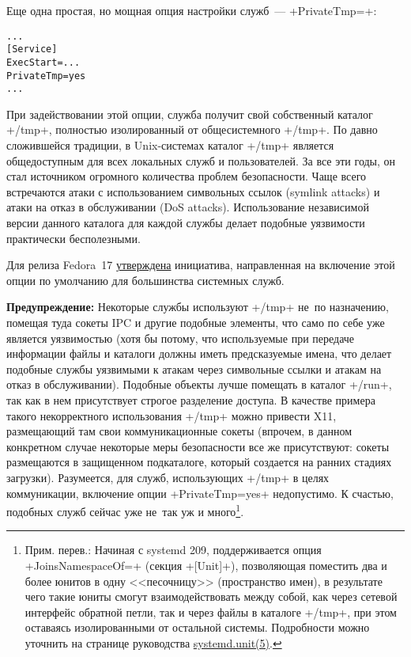 \documentclass[10pt,oneside,a4paper]{article}
\newenvironment{caveat}[1][]{\smallskip\par\textbf{Предупреждение#1: }}%
	{\smallskip\par}
\begin{document}
Еще одна простая, но мощная опция настройки служб~--- +PrivateTmp=+:
\begin{Verbatim}
...
[Service]
ExecStart=...
PrivateTmp=yes
...
\end{Verbatim}
При задействовании этой опции, служба получит свой собственный каталог +/tmp+,
полностью изолированный от общесистемного +/tmp+. По давно сложившейся традиции,
в Unix-системах каталог +/tmp+ является общедоступным для всех локальных служб и
пользователей. За все эти годы, он стал источником огромного количества проблем
безопасности. Чаще всего встречаются атаки с использованием символьных ссылок
(symlink attacks) и атаки на отказ в обслуживании (DoS attacks). Использование 
независимой версии данного каталога для каждой службы делает подобные уязвимости
практически бесполезными.

Для релиза Fedora~17
\href{https://fedoraproject.org/wiki/Features/ServicesPrivateTmp}{утверждена}
инициатива, направленная на включение этой опции по умолчанию для большинства
системных служб.

\begin{caveat}
Некоторые службы используют +/tmp+ не~по назначению,
помещая туда сокеты IPC и другие подобные элементы, что само по себе уже
является уязвимостью (хотя бы потому, что используемые при передаче информации
файлы и каталоги должны иметь предсказуемые имена, что делает подобные службы
уязвимыми к атакам через символьные ссылки и атакам на отказ в обслуживании).
Подобные объекты лучше помещать в каталог +/run+, так как в нем присутствует
строгое разделение доступа. В качестве примера такого некорректного
использования +/tmp+ можно привести X11, размещающий там свои коммуникационные
сокеты (впрочем, в данном конкретном случае некоторые меры безопасности все же
присутствуют: сокеты размещаются в защищенном подкаталоге, который создается на
ранних стадиях загрузки). Разумеется, для служб, использующих +/tmp+ в целях
коммуникации, включение опции +PrivateTmp=yes+ недопустимо. К счастью, подобных
служб сейчас уже не~так уж и много\footnote{Прим. перев.: Начиная с systemd 209,
поддерживается опция +JoinsNamespaceOf=+ (секция +[Unit]+), позволяющая
поместить два и более юнитов в одну <<песочницу>> (пространство имен), в
результате чего такие юниты смогут взаимодействовать между собой, как через
сетевой интерфейс обратной петли, так и через файлы в каталоге +/tmp+, 
при этом оставаясь изолированными от остальной системы. Подробности можно
уточнить на странице руководства
\href{http://www.freedesktop.org/software/systemd/man/systemd.unit.html}{systemd.unit(5)}.}.
\end{caveat}
\end{document}
